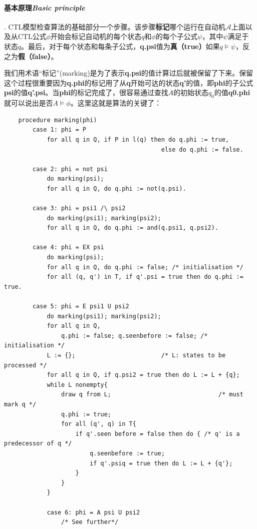 \documentclass{book}
\begin{document}
    \paragraph{基本原理{\itshape Basic principle}}. CTL模型检查算法的基础部分一个步骤。该步骤\textbf{标记}哪个运行在自动机$\mathcal{A}$上面以及从CTL公式$\phi$开始会标记自动机的每个状态$q$和$\phi$的每个子公式$\psi$，其中$\psi$满足于状态$q$。最后，对于每个状态和每条子公式，\textbf{q.psi}值为\textbf{真（true）}如果$q\models\psi$，反之为\textbf{假（false）}。

    我们用术语“标记”(marking)是为了表示\textbf{q.psi}的值计算过后就被保留了下来。保留这个过程很重要因为\textbf{q.phi}的标记用了从\textbf{q}开始可达的状态\textbf{q'}的值，即\textbf{phi}的子公式\textbf{psi}的值\textbf{q'.psi}。当\textbf{phi}的标记完成了，很容易通过查找$A$的初始状态$q_0$的值\textbf{q0.phi}就可以说出是否$A\models\phi$。这里这就是算法的关键了：

    \lstset{language=C}
    \begin{lstlisting}
    procedure marking(phi)
        case 1: phi = P
            for all q in Q, if P in l(q) then do q.phi := true,
                                            else do q.phi := false.

        case 2: phi = not psi
            do marking(psi);
            for all q in Q, do q.phi := not(q.psi).

        case 3: phi = psi1 /\ psi2
            do marking(psi1); marking(psi2);
            for all q in Q, do q.phi := and(q.psi1, q.psi2).

        case 4: phi = EX psi
            do marking(psi);
            for all q in Q, do q.phi := false; /* initialisation */
            for all (q, q') in T, if q'.psi = true then do q.phi := true.

        case 5: phi = E psi1 U psi2
            do marking(psi1); marking(psi2);
            for all q in Q,
                q.phi := false; q.seenbefore := false; /* initialisation */
            L := {};                        /* L: states to be processed */
            for all q in Q, if q.psi2 = true then do L := L + {q};
            while L nonempty{
                draw q from L;                              /* must mark q */
                q.phi := true;
                for all (q', q) in T{
                    if q'.seen before = false then do { /* q' is a predecessor of q */
                        q.seenbefore := true;
                        if q'.psiq = true then do L := L + {q'};
                    }
                }
            }

            case 6: phi = A psi U psi2
                /* See further*/
    \end{lstlisting}
\end{document}
